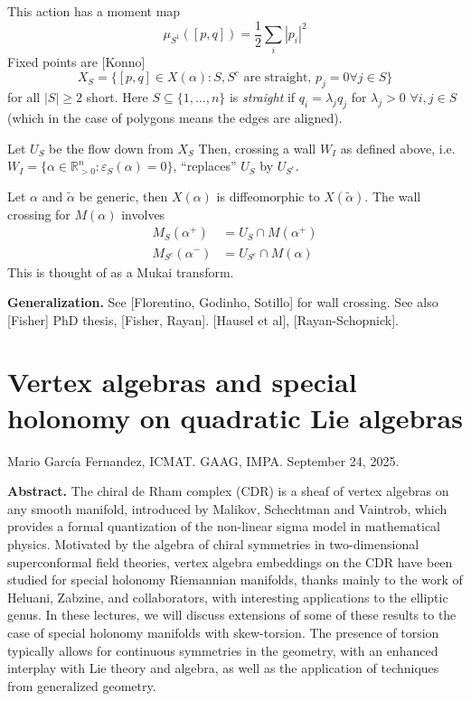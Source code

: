 This action has a moment map
$$
\mu_{S^1}([p,q])=\frac{1}{2}\sum_{i}|p_i|^2
$$
Fixed points are [Konno]
$$
X_S=\{[p,q] \in X(\alpha):
S,S^c \text{ are straight, }p_j=0 \forall j
\in S\}
$$
for all $|S|\geq 2$ short. Here $S\subseteq
\{1,\ldots,n\}$
is {\it straight} if $q_i=\lambda_j q_j$
for $\lambda_j>0$ $\forall  i,j \in S$
(which in the case of polygons means the
edges are aligned).

Let $U_S$ be the flow down from $X_S$
Then, crossing a wall  $W_I$ as defined
above,
i.e. $W_I=\{\alpha \in
\mathbb{R}^n_{>0}:\varepsilon_S(\alpha)=0\}$,
``replaces'' $U_S$ by $U_{S^c}$.

Let $\alpha$ and $\tilde{\alpha}$ be generic,
then $X(\alpha)$ is diffeomorphic to
$X(\tilde{\alpha})$.
The wall crossing for $M(\alpha)$
involves
$$
\begin{aligned}
M_S(\alpha^+)&=U_S \cap M(\alpha^+)\\
M_{S^c}(\alpha^-)&=U_{S^c}\cap M(\alpha)
\end{aligned}
$$
This is thought of as a Mukai transform.

\medskip\noindent
{\bf Generalization.}
See [Florentino, Godinho, Sotillo] for wall
crossing.
See also [Fisher] PhD thesis, [Fisher,
Rayan].
[Hausel et al], [Rayan-Schopnick].

\section{Vertex algebras and special holonomy
on quadratic Lie algebras}
\label{section-verte-algeb-speci-holon}

\noindent
Mario García Fernandez, ICMAT.
GAAG, IMPA.
September 24, 2025.

\medskip\noindent
{\bf Abstract.}
The chiral de Rham complex (CDR) is a sheaf
of vertex algebras on any smooth
manifold, introduced by Malikov, Schechtman
and Vaintrob, which provides a
formal quantization of the non-linear sigma
model in mathematical physics.
Motivated by the algebra of chiral symmetries
in two-dimensional superconformal
field theories, vertex algebra embeddings on
the CDR have been studied for
special holonomy Riemannian manifolds, thanks
mainly to the work of Heluani,
Zabzine, and collaborators, with interesting
applications to the elliptic genus.
In these lectures, we will discuss extensions
of some of these results to the
case of special holonomy manifolds with
skew-torsion. The presence of torsion
typically allows for continuous symmetries in
the geometry, with an enhanced
interplay with Lie theory and algebra, as
well as the application of techniques
from generalized geometry.


